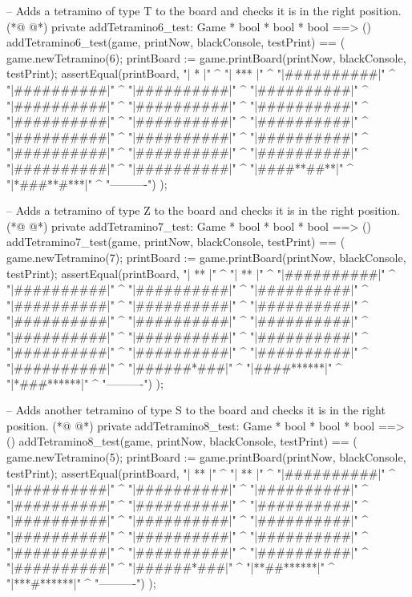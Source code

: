 \begin{vdmpp}[breaklines=true]
  -- Adds a tetramino of type T to the board and checks it is in the right position.
(*@
\label{addTetramino6:test:196}
@*)
  private addTetramino6_test: Game * bool * bool * bool ==> ()
  addTetramino6_test(game, printNow, blackConsole, testPrint) == (  
   game.newTetramino(6);
   printBoard := game.printBoard(printNow, blackConsole, testPrint);
   assertEqual(printBoard, 
    "\n|    *     |" ^
    "\n|   ***    |" ^
    "\n|##########|" ^
    "\n|##########|" ^
    "\n|##########|" ^
    "\n|##########|" ^
    "\n|##########|" ^
    "\n|##########|" ^
    "\n|##########|" ^
    "\n|##########|" ^
    "\n|##########|" ^
    "\n|##########|" ^
    "\n|##########|" ^
    "\n|##########|" ^
    "\n|##########|" ^
    "\n|##########|" ^
    "\n|##########|" ^
    "\n|##########|" ^
    "\n|##########|" ^
    "\n|##########|" ^
    "\n|####**##**|" ^
    "\n|*###**#***|" ^
    "\n ----------")
  );

  -- Adds a tetramino of type Z to the board and checks it is in the right position.
(*@
\label{addTetramino7:test:227}
@*)
  private addTetramino7_test: Game * bool * bool * bool ==> ()
  addTetramino7_test(game, printNow, blackConsole, testPrint) == (  
   game.newTetramino(7);
   printBoard := game.printBoard(printNow, blackConsole, testPrint);
   assertEqual(printBoard, 
    "\n|   **     |" ^
    "\n|    **    |" ^
    "\n|##########|" ^
    "\n|##########|" ^
    "\n|##########|" ^
    "\n|##########|" ^
    "\n|##########|" ^
    "\n|##########|" ^
    "\n|##########|" ^
    "\n|##########|" ^
    "\n|##########|" ^
    "\n|##########|" ^
    "\n|##########|" ^
    "\n|##########|" ^
    "\n|##########|" ^
    "\n|##########|" ^
    "\n|##########|" ^
    "\n|##########|" ^
    "\n|##########|" ^
    "\n|######*###|" ^
    "\n|####******|" ^
    "\n|*###******|" ^
    "\n ----------")
  );
  
  -- Adds another tetramino of type S to the board and checks it is in the right position.
(*@
\label{addTetramino8:test:258}
@*)
  private addTetramino8_test: Game * bool * bool * bool ==> ()
  addTetramino8_test(game, printNow, blackConsole, testPrint) == (  
   game.newTetramino(5);
   printBoard := game.printBoard(printNow, blackConsole, testPrint);
   assertEqual(printBoard, 
    "\n|    **    |" ^
    "\n|   **     |" ^
    "\n|##########|" ^
    "\n|##########|" ^
    "\n|##########|" ^
    "\n|##########|" ^
    "\n|##########|" ^
    "\n|##########|" ^
    "\n|##########|" ^
    "\n|##########|" ^
    "\n|##########|" ^
    "\n|##########|" ^
    "\n|##########|" ^
    "\n|##########|" ^
    "\n|##########|" ^
    "\n|##########|" ^
    "\n|##########|" ^
    "\n|##########|" ^
    "\n|##########|" ^
    "\n|######*###|" ^
    "\n|**##******|" ^
    "\n|***#******|" ^
    "\n ----------")
  );
  

\end{vdmpp}
